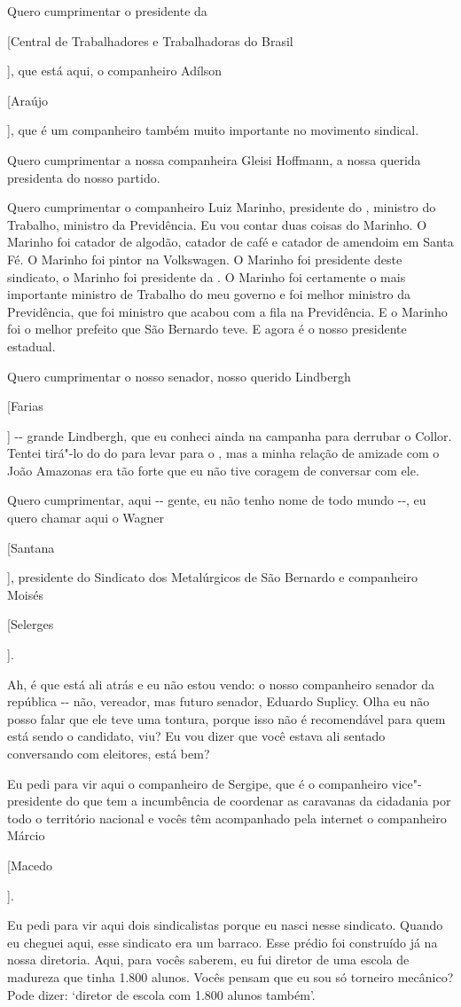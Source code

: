{{{{{{{{Quero cumprimentar o presidente da  {[Central de Trabalhadores
e Trabalhadoras do Brasil{], que está aqui, o companheiro Adílson
{[Araújo{], que é um companheiro também muito importante no movimento
sindical.

Quero cumprimentar a nossa companheira Gleisi Hoffmann, a nossa
querida presidenta do nosso partido.

Quero cumprimentar o companheiro Luiz Marinho, presidente do ,
ministro do Trabalho, ministro da Previdência. Eu vou contar duas coisas
do Marinho. O Marinho foi catador de algodão, catador de café e catador
de amendoim em Santa Fé. O Marinho foi pintor na Volkswagen. O Marinho
foi presidente deste sindicato, o Marinho foi presidente da . O
Marinho foi certamente o mais importante ministro de Trabalho do meu
governo e foi melhor ministro da Previdência, que foi ministro que
acabou com a fila na Previdência. E o Marinho foi o melhor prefeito que
São Bernardo teve. E agora é o nosso presidente estadual.

Quero cumprimentar o nosso senador, nosso querido Lindbergh
{[Farias{] -\/- grande Lindbergh, que eu conheci ainda na campanha
para derrubar o Collor. Tentei tirá"-lo do do para levar para o ,
mas a minha relação de amizade com o João Amazonas era tão forte que eu
não tive coragem de conversar com ele.

Quero cumprimentar, aqui -\/- gente, eu não tenho nome de todo
mundo -\/-, eu quero chamar aqui o Wagner {[Santana{], presidente do
Sindicato dos Metalúrgicos de São Bernardo e companheiro Moisés
{[Selerges{].

Ah, é que está ali atrás e eu não estou vendo: o nosso companheiro
senador da república -\/- não, vereador, mas futuro senador, Eduardo
Suplicy. Olha eu não posso falar que ele teve uma tontura, porque isso
não é recomendável para quem está sendo o candidato, viu? Eu vou dizer
que você estava ali sentado conversando com eleitores, está bem?

Eu pedi para vir aqui o companheiro de Sergipe, que é o
companheiro vice"-presidente do  que tem a incumbência de coordenar as
caravanas da cidadania por todo o território nacional e vocês têm
acompanhado pela internet o companheiro Márcio {[Macedo{].

Eu pedi para vir aqui dois sindicalistas porque eu nasci nesse
sindicato. Quando eu cheguei aqui, esse sindicato era um barraco. Esse
prédio foi construído já na nossa diretoria. Aqui, para vocês saberem,
eu fui diretor de uma escola de madureza que tinha 1.800 alunos. Vocês
pensam que eu sou só torneiro mecânico? Pode dizer: `diretor de escola
com 1.800 alunos também'.

}}}}}}}}}}}}}}}}}}}}
